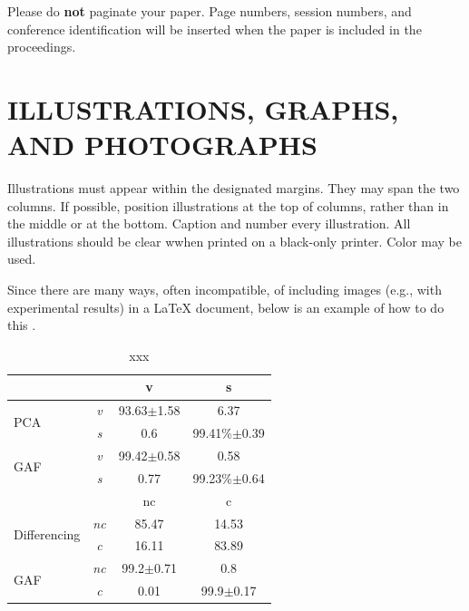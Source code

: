 \documentclass{article}
\begin{document}
Please do {\bf not} paginate your paper.  Page numbers, session numbers, and
conference identification will be inserted when the paper is included in the
proceedings.

\section{ILLUSTRATIONS, GRAPHS, AND PHOTOGRAPHS}
\label{sec:illust}

Illustrations must appear within the designated margins.  They may span the two
columns.  If possible, position illustrations at the top of columns, rather
than in the middle or at the bottom.  Caption and number every illustration.
All illustrations should be clear wwhen printed on a black-only printer. Color
may be used.

Since there are many ways, often incompatible, of including images (e.g., with
experimental results) in a LaTeX document, below is an example of how to do
this \cite{Lamp86}.

\begin{table}
\begin{tabular}{ |l|c c c| }
\hline
& & v & s\\
\hline
\multirow{2}{*}{PCA} & \emph{v} & 93.63$\pm$1.58&6.37\\
& \emph{s}& 0.6& 99.41\%$\pm$0.39\\
\hline
\multirow{2}{*}{GAF} & \emph{v} & 99.42$\pm$0.58&0.58\\
& \emph{s}& 0.77& 99.23\%$\pm$0.64\\
\hline
\hline
& & nc & c\\
\hline
\multirow{2}{*}{Differencing} & \emph{nc} & 85.47 & 14.53\\
& \emph{c}& 16.11 & 83.89\\
\multirow{2}{*}{GAF} & \emph{nc} & 99.2$\pm$0.71 & 0.8\\
& \emph{c}& 0.01 & 99.9$\pm$0.17\\
\hline
\end{tabular}
\caption{xxx}
\label{tab:cm}
\end{table}
\end{document}
